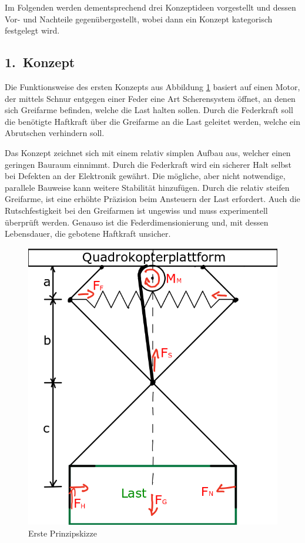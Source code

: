 Im Folgenden werden dementsprechend drei Konzeptideen vorgestellt und dessen Vor- und Nachteile gegenübergestellt, wobei dann ein Konzept kategorisch festgelegt wird.

\subsection{1.~Konzept}
Die Funktionsweise des ersten Konzepts aus Abbildung \ref{erste_prinzipskizze} basiert auf einen Motor, der mittels Schnur entgegen einer Feder eine Art Scherensystem öffnet, an denen sich Greifarme befinden, welche die Last halten sollen. Durch die Federkraft soll die benötigte Haftkraft über die Greifarme an die Last geleitet werden, welche ein Abrutschen verhindern soll.
\par
Das Konzept zeichnet sich mit einem relativ simplen Aufbau aus, welcher einen geringen Bauraum einnimmt. Durch die Federkraft wird ein sicherer Halt selbst bei Defekten an der Elektronik gewährt. Die mögliche, aber nicht notwendige, parallele Bauweise kann weitere Stabilität hinzufügen.
Durch die relativ steifen Greifarme, ist eine erhöhte Präzision beim Ansteuern der Last erfordert. Auch die Rutschfestigkeit bei den Greifarmen ist ungewiss und muss experimentell überprüft werden.
Genauso ist die Federdimensionierung und, mit dessen Lebensdauer, die gebotene Haftkraft unsicher.
\begin{figure}[h]
	\begin{center}
	\includegraphics[scale=0.5]{"Grafiken/Skizze1mechanik.png"}
	\caption{Erste Prinzipskizze}
	\label{erste_prinzipskizze}
	\end{center}
\end{figure}

